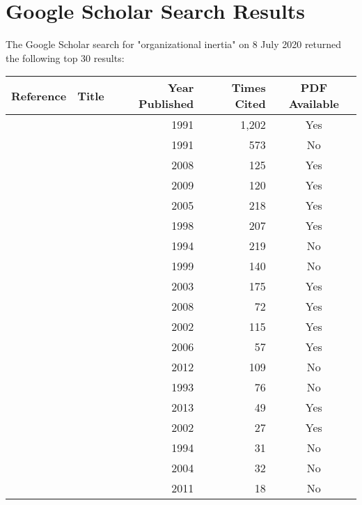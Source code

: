 \section{Google Scholar Search Results}

The Google Scholar search for "organizational inertia" on 8 July 2020 returned the following top  30 results:\\
\begin{tabular}{|c|c|r|r|c|}
	\hline 
	Reference & Title & Year Published & Times Cited & PDF Available \\ 
	\hline 

    \cite{kelly1991organizational} &  & 1991 & 1,202 & Yes \\
	\hline 
    \cite{dean1991integrated}      &  & 1991 & 573 & No \\
	\hline 
    \cite{barnett2008red} & & 2008 & 125 & Yes \\
	\hline 
    \cite{geiger2009narratives} & & 2009 & 120 & Yes \\
	\hline 
    \cite{shimizu2005constrains} & & 2005 & 218 & Yes \\
	\hline 
    \cite{van1998bridging} & & 1998 & 207 & Yes \\
	\hline 
    \cite{snell1994strategic} & & 1994 & 219 & No \\
	\hline 
    \cite{lazerson1999resisting} & & 1999 & 140 & No \\
	\hline 
    \cite{dobrev2003shifting} & & 2003 & 175 & Yes \\
	\hline 
    \cite{godkin2008overcoming} & & 2008 & 72 & Yes \\
	\hline 
    \cite{larsen2002representing} & & 2002 & 115 & Yes \\
	\hline 
    \cite{boyer2006organizational} & & 2006 & 57 & Yes \\
	\hline 
    \cite{naslund2012appropriated} & & 2012 & 109 & No \\
	\hline 
    \cite{dean1993determinants} & & 1993 & 76 & No \\
	\hline 
    \cite{nedzinskas2013impact} & & 2013 & 49 & Yes \\
	\hline 
    \cite{hannan2002structural} & & 2002 & 27 & Yes \\
	\hline 
    \cite{lorenz1994organizational} & & 1994 & 31 & No \\
	\hline 
    \cite{chiu2004hollowing} & & 2004 & 32 & No \\
	\hline 
    \cite{allcorn2011workplace} & & 2011 & 18 & No \\

\end{tabular}

